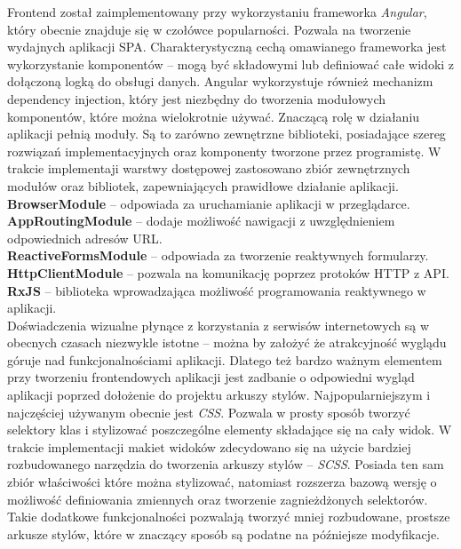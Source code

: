 Frontend został zaimplementowany przy wykorzystaniu frameworka \textit{Angular}, który obecnie znajduje się w czołówce popularności. Pozwala na tworzenie wydajnych aplikacji SPA. Charakterystyczną cechą omawianego frameworka jest wykorzystanie komponentów -- mogą być składowymi lub definiować całe widoki z dołączoną logką do obsługi danych. Angular wykorzystuje również mechanizm dependency injection, który jest niezbędny do tworzenia modułowych komponentów, które można wielokrotnie używać. Znaczącą rolę w działaniu aplikacji pełnią moduły. Są to zarówno zewnętrzne biblioteki, posiadające szereg rozwiązań implementacyjnych oraz komponenty tworzone przez programistę. W trakcie implementaji warstwy dostępowej zastosowano zbiór zewnętrznych modułów oraz bibliotek, zapewniających prawidłowe działanie aplikacji.\\
\textbf{BrowserModule} -- odpowiada za uruchamianie aplikacji w przeglądarce.\\
\textbf{AppRoutingModule} -- dodaje możliwość nawigacji z uwzględnieniem odpowiednich adresów URL.\\
\textbf{ReactiveFormsModule} -- odpowiada za tworzenie reaktywnych formularzy.\\
\textbf{HttpClientModule} -- pozwala na komunikację poprzez protoków HTTP z API.\\
\textbf{RxJS} -- biblioteka wprowadzająca możliwość programowania reaktywnego w aplikacji.\\

Doświadczenia wizualne płynące z korzystania z serwisów internetowych są w obecnych czasach niezwykle istotne -- można by założyć że atrakcyjność wyglądu góruje nad funkcjonalnościami aplikacji. Dlatego też bardzo ważnym elementem przy tworzeniu frontendowych aplikacji jest zadbanie o odpowiedni wygląd aplikacji poprzed dołożenie do projektu arkuszy stylów. Najpopularniejszym i najczęściej używanym obecnie jest \textit{CSS}. Pozwala w prosty sposób tworzyć selektory klas i stylizować poszczególne elementy składające się na cały widok. W trakcie implementacji makiet widoków zdecydowano się na użycie bardziej rozbudowanego narzędzia do tworzenia arkuszy stylów -- \textit{SCSS}. Posiada ten sam zbiór właściwości które można stylizować, natomiast rozszerza bazową wersję o możliwość definiowania zmiennych oraz tworzenie zagnieżdżonych selektorów. Takie dodatkowe funkcjonalności pozwalają tworzyć mniej rozbudowane, prostsze arkusze stylów, które w znaczący sposób są podatne na późniejsze modyfikacje.